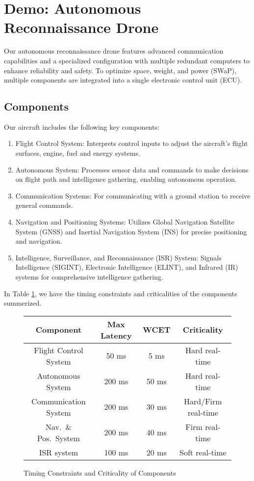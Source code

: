 \newpage
\section{Demo: Autonomous Reconnaissance Drone}
Our autonomous reconnaissance drone features advanced communication capabilities and a specialized configuration with multiple redundant computers to enhance reliability and safety. 
To optimize space, weight, and power (SWaP), multiple components are integrated into a single electronic control unit (ECU).

\subsection{Components}
Our aircraft includes the following key components:
\begin{enumerate}[label=P\arabic*)]
	\item Flight Control System: 
		Interprets control inputs to adjust the aircraft's flight surfaces, engine, fuel and energy systems.
	\item Autonomous System: Processes sensor data and commands to make decisions on flight path and intelligence gathering, enabling autonomous operation.
	\item Communication Systems: For communicating with a ground station to receive general commands.
	\item Navigation and Positioning Systems: Utilizes Global Navigation Satellite System (GNSS) and Inertial Navigation System (INS) for precise positioning and navigation.
	\item Intelligence, Surveillance, and Reconnaissance (ISR) System: Signals Intelligence (SIGINT), Electronic Intelligence (ELINT), and Infrared (IR) systems for comprehensive intelligence gathering.
\end{enumerate}

In Table \ref{tbl:drone}, we have the timing constraints and criticalities of the components summerized.

\begin{figure}[ht]
	\centering
	\begin{tabular}{c | c | c | c}
		Component & Max Latency & WCET & Criticality \\\hline
		Flight Control System & 50 ms & 5 ms & Hard real-time \\
		Autonomous System & 200 ms & 50 ms & Hard real-time \\
		Communication System & 200 ms & 30 ms & Hard/Firm real-time \\
		Nav.\ \& Pos.\ System & 200 ms & 40 ms & Firm real-time \\
		ISR system & 100 ms & 20 ms & Soft real-time \\
	\end{tabular}
	\caption{Timing Constraints and Criticality of Components}
	\label{tbl:drone}
\end{figure}


